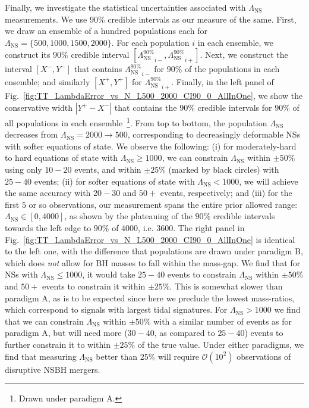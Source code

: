 \documentclass[aps,prd,amsmath,floats,floatfix, twocolumn,
superscriptaddress,nofootinbib,showpacs]{revtex4-1}
\newcommand{\lambdans}{\Lambda_\mathrm{NS}}
\begin{document}
Finally, we investigate the statistical uncertainties associated with
$\lambdans$ measurements. We use $90\%$ credible intervals as our measure of
the same. First, we draw an ensemble of a hundred populations each for
$\lambdans=\{500,1000,1500,2000\}$. For each population $i$ in each ensemble,
we construct
its $90\%$ credible interval $[{\lambdans^{90\%}}_{i-},{\lambdans^{90\%}}_{i+}]$.
Next, we construct the interval $[X^-,Y^-]$ that contains ${\lambdans^{90\%}}_{i-}$
for $90\%$ of the populations in each ensemble; and similarly $[X^+,Y^+]$
for ${\lambdans^{90\%}}_{i+}$. Finally, in the left panel of 
Fig.~\ref{fig:TT_LambdaError_vs_N_L500_2000_CI90_0_AllInOne}, we show the
conservative width $|Y^+ - X^-|$ that contains the $90\%$ credible
intervals for $90\%$ of all populations in each ensemble~\footnote{Drawn
under paradigm A.}.
% 
% 
From top to bottom, the population $\lambdans$
decreases from $\lambdans=2000\rightarrow 500$, corresponding to decreasingly
deformable NSs with softer equations of state. We observe the following:
(i) for moderately-hard to hard equations of state with $\lambdans\geq 1000$,
we can constrain $\lambdans$ within $\pm 50\%$ using only $10-20$ events, and
within $\pm 25\%$ (marked by black circles) with $25-40$ events; (ii) for softer 
equations of state with
$\lambdans<1000$, we will achieve the same accuracy with $20-30$ and $50+$ 
events, respectively; and (iii) for the first $5$ or so observations, our
measurement spans the entire prior allowed range:
$\lambdans\in[0,4000]$, as shown by the plateauing of the $90\%$ 
credible intervals towards the left edge to $90\%$ of $4000$, i.e. $3600$.
% 
The right panel in Fig.~\ref{fig:TT_LambdaError_vs_N_L500_2000_CI90_0_AllInOne}
is identical to the left one, with the difference that populations are drawn
under paradigm B, which does {\it not} allow for BH masses to fall within
the mass-gap. We find that
for NSs with $\lambdans\leq 1000$, it would take $25-40$ events to
constrain $\lambdans$ within $\pm 50\%$ and $50+$ events to constrain it
within $\pm 25\%$. This is somewhat slower than paradigm A, as is to be
expected since here we preclude the lowest mass-ratios, which correspond to
signals with largest tidal signatures. For $\lambdans>1000$ we find that we
can constrain $\lambdans$ within $\pm 50\%$ with a similar number of events as
for paradigm A, but will need more ($30-40$, as compared to $25-40$) events
to further constrain it to within $\pm 25\%$ of the true value.
% 
Under either paradigms, we find that measuring $\lambdans$ better than
$25\%$ will require $\mathcal{O}(10^2)$ observations of disruptive NSBH
mergers.
\end{document}
